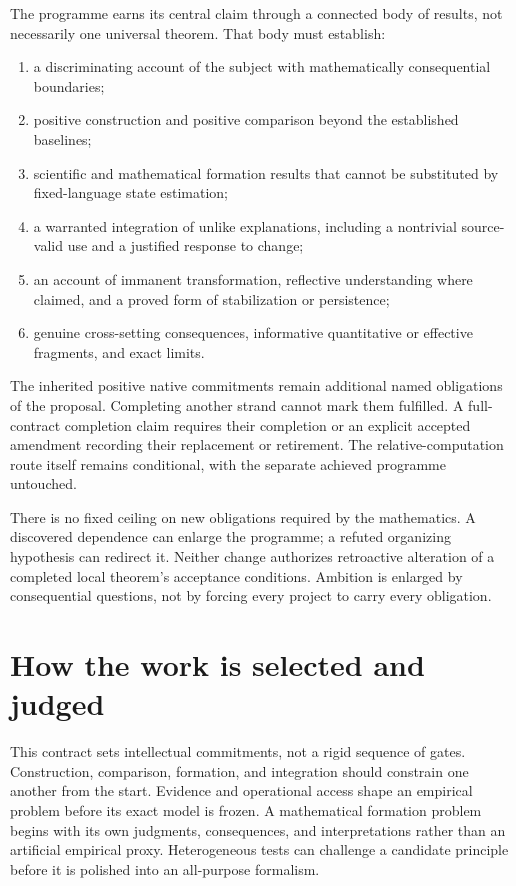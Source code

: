 \documentclass[11pt]{article}
\theoremstyle{definition}
\begin{document}
The programme earns its central claim through a connected body of results, not necessarily one universal theorem. That body must establish:
\begin{enumerate}
\item a discriminating account of the subject with mathematically consequential boundaries;
\item positive construction and positive comparison beyond the established baselines;
\item scientific and mathematical formation results that cannot be substituted by fixed-language state estimation;
\item a warranted integration of unlike explanations, including a nontrivial source-valid use and a justified response to change;
\item an account of immanent transformation, reflective understanding where claimed, and a proved form of stabilization or persistence;
\item genuine cross-setting consequences, informative quantitative or effective fragments, and exact limits.
\end{enumerate}
The inherited positive native commitments remain additional named obligations of the proposal. Completing another strand cannot mark them fulfilled. A full-contract completion claim requires their completion or an explicit accepted amendment recording their replacement or retirement. The relative-computation route itself remains conditional, with the separate achieved programme untouched.

There is no fixed ceiling on new obligations required by the mathematics. A discovered dependence can enlarge the programme; a refuted organizing hypothesis can redirect it. Neither change authorizes retroactive alteration of a completed local theorem's acceptance conditions. Ambition is enlarged by consequential questions, not by forcing every project to carry every obligation.

\section{How the work is selected and judged}
\label{sec:practice}

This contract sets intellectual commitments, not a rigid sequence of gates. Construction, comparison, formation, and integration should constrain one another from the start. Evidence and operational access shape an empirical problem before its exact model is frozen. A mathematical formation problem begins with its own judgments, consequences, and interpretations rather than an artificial empirical proxy. Heterogeneous tests can challenge a candidate principle before it is polished into an all-purpose formalism.
\end{document}
